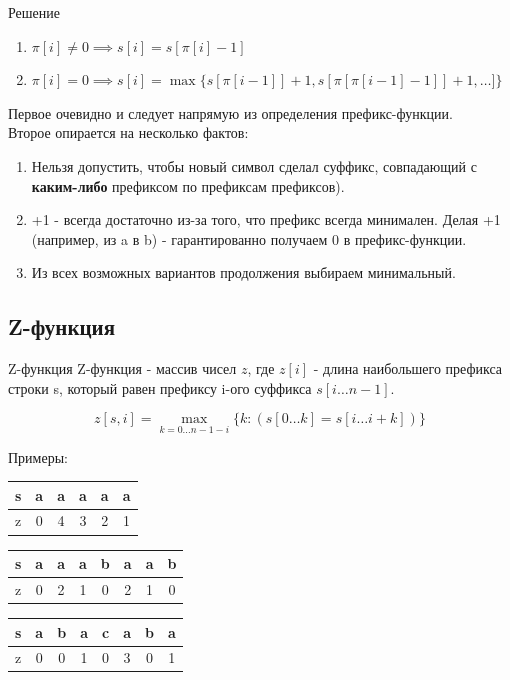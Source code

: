 \documentclass[10pt]{beamer}
\begin{document}
\begin{frame}[fragile]{Решение}
\begin{enumerate}
    \item $\pi[i] \ne 0 \implies s[i] = s[\pi[i] - 1]$
    \item $\pi[i] = 0 \implies s[i] = \max \{s[\pi[i - 1]] + 1, s[\pi[\pi[i - 1]-1]]+1, \ldots] \}$\\
\end{enumerate}
Первое очевидно и следует напрямую из определения префикс-функции.\\
Второе опирается на несколько фактов:
\begin{enumerate}
    \item Нельзя допустить, чтобы новый символ сделал суффикс, совпадающий с  \textbf{каким-либо} префиксом по префиксам префиксов).
    \item +1 - всегда достаточно из-за того, что префикс всегда минимален. Делая +1 (например, из a в b) - гарантированно получаем 0 в префикс-функции.
    \item Из всех возможных вариантов продолжения выбираем минимальный.
\end{enumerate}
\end{frame}

\subsection{Z-функция}
\begin{frame}[fragile]{Z-функция}
Z-функция - массив чисел $z$, где $z[i]$ - длина наибольшего префикса строки s, который равен префиксу i-ого суффикса  $s[i \ldots n-1]$.

\[z[s, i] = \max_{k=0 \ldots n-1-i} \{k: (s[0\dots k] = s[i\ldots i+k]) \}\]


Примеры:
\begin{center}
\begin{tabular}{ |c|ccccc| } 
 \hline
 s & a & a & a & a & a\\ 
  \hline
z & 0 & 4 & 3 & 2 & 1 \\ 
 \hline
\end{tabular}
\end{center}
\begin{center}
\begin{tabular}{ |c|ccccccc| } 
 \hline
 s & a & a & a & b & a & a & b\\ 
  \hline
z & 0 & 2 & 1 & 0 & 2 & 1 & 0 \\ 
 \hline
\end{tabular}
\end{center}
\begin{center}
\begin{tabular}{ |c|ccccccc| } 
 \hline
 s & a & b & a & c & a & b & a\\ 
  \hline
z & 0 & 0 & 1 & 0 & 3 & 0 & 1 \\ 
 \hline
\end{tabular}
\end{center}
\end{frame}
\end{document}
